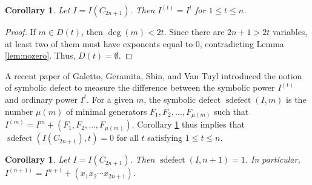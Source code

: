 \documentclass[12pt]{amsart}
\def\sdefect{\operatorname{sdefect}}
\renewcommand{\leq}{\leqslant}
\renewcommand{\le}{\leqslant}
\theoremstyle{plain}
\newtheorem{corollary}[theorem]{Corollary}
\theoremstyle{definition}
\begin{document}
\begin{corollary}\label{cor:ordsymequal}
Let $I=I(C_{2n+1})$. Then $I^{(t)} = I^t$ for $1\leq t \leq n$.
\end{corollary}



\begin{proof}
%
If $m\in D(t)$, then $\deg(m) < 2t$.
Since there are $2n+1 > 2t$ variables, at least two of them must have exponents equal to 0, contradicting Lemma \ref{lem:nozero}.
Thus, $D(t) = \emptyset$.
%
\end{proof}


A recent paper of Galetto, Geramita, Shin, and Van Tuyl \cite{2016:galettogeramitavantuyl} introduced the notion of symbolic defect to measure the difference between the symbolic power $I^{(t)}$ and ordinary power $I^{t}$.
For a given $m$, the symbolic defect $\sdefect(I,m)$ is the number $\mu(m)$ of minimal generators $F_1, F_2, \ldots, F_{\mu(m)}$ such that $I^{(m)} = I^m + (F_1, F_2, \ldots, F_{\mu(m)})$.
Corollary \ref{cor:ordsymequal} thus implies that $\sdefect(I(C_{2n+1}),t) = 0$ for all $t$ satisfying $1\le t \le n$.



\begin{corollary}\label{cor:t=n+1}
Let $I=I(C_{2n+1})$. 
Then $\sdefect(I, n+1) = 1$. 
In particular, $I^{(n+1)} = I^{n+1} + (x_1x_2\cdots x_{2n+1})$.
\end{corollary}
\end{document}
